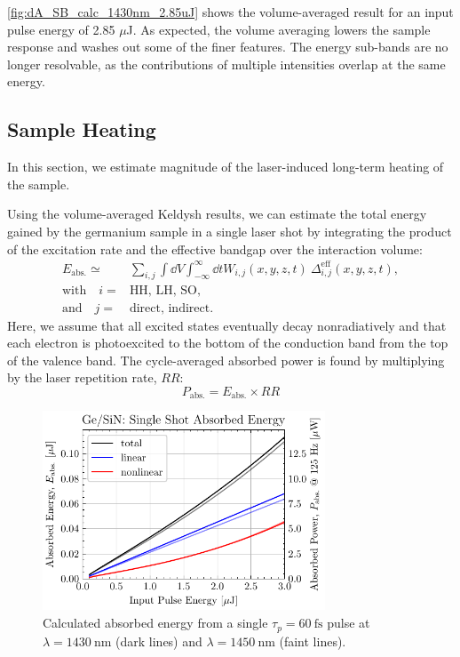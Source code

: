 \cref{fig:dA_SB_calc_1430nm_2.85uJ} shows the volume-averaged result for an input pulse energy of 2.85 $\mu$J. As expected, the volume averaging lowers the sample response and washes out some of the finer features. The energy sub-bands are no longer resolvable, as the contributions of multiple intensities overlap at the same energy.



\subsection{Sample Heating}

In this section, we estimate magnitude of the laser-induced long-term heating of the sample. 

Using the volume-averaged Keldysh results, we can estimate the total energy gained by the germanium sample in a single laser shot by integrating the product of the excitation rate and the effective bandgap over the interaction volume:
\begin{equation}
\begin{split}
E_{\textrm{abs.}} \simeq {}& \sum_{i,j} \int \dd{V} \int_{-\infty}^{\infty} \dd{t} W_{i,j} (x, y, z, t) \ \Delta_{i,j}^{\textrm{eff}}(x,y,z,t), \\
\textrm{with} \quad i={}&\textrm{HH, LH, SO}, \\
\textrm{and} \quad j={}&\textrm{direct, indirect.}
\end{split}
\label{eqn:absorbed_energy}
\end{equation}
Here, we assume that all excited states eventually decay nonradiatively and that each electron is photoexcited to the bottom of the conduction band from the top of the valence band. The cycle-averaged absorbed power is found by multiplying by the laser repetition rate, $RR$:
\begin{equation}
P_{\textrm{abs.}} = E_{\textrm{abs.}} \times RR
\label{eqn:absorbed_power}
\end{equation}

\begin{figure}
	\centering
	\includegraphics[width=0.75\textwidth]{figures/chap4/Single_shot_abs_ener.pdf}
	\caption{Calculated absorbed energy from a single $\tau_p = 60 \ \textrm{fs}$ pulse at $\lambda=1430 \ \textrm{nm}$ (dark lines) and $\lambda = 1450 \ \textrm{nm}$ (faint lines).}
	\label{fig:Single_shot_abs_ener}
\end{figure}

